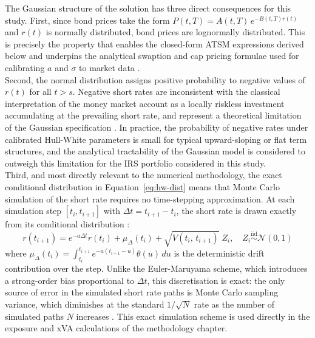     \noindent
    The Gaussian structure of the solution has three direct consequences for this study. First, since bond prices take the form $P(t,T) = A(t,T)\,e^{-B(t,T)r(t)}$ and $r(t)$ is normally distributed, bond prices are lognormally distributed. This is precisely the property that enables the closed-form ATSM expressions derived below and underpins the analytical swaption and cap pricing formulae used for calibrating $a$ and $\sigma$ to market data \cite{brigo2001interest}. \\

    \noindent
    Second, the normal distribution assigns positive probability to negative values of $r(t)$ for all $t > s$. Negative short rates are inconsistent with the classical interpretation of the money market account as a locally riskless investment accumulating at the prevailing short rate, and represent a theoretical limitation of the Gaussian specification \cite{Green_2016}. In practice, the probability of negative rates under calibrated Hull-White parameters is small for typical upward-sloping or flat term structures, and the analytical tractability of the Gaussian model is considered to outweigh this limitation for the IRS portfolio considered in this study. \\

    \noindent
    Third, and most directly relevant to the numerical methodology, the exact conditional distribution in Equation~\eqref{eq:hw-dist} means that Monte Carlo simulation of the short rate requires no time-stepping approximation. At each simulation step $[t_i, t_{i+1}]$ with $\Delta t = t_{i+1} - t_i$, the short rate is drawn exactly from its conditional distribution \cite{brigo2001interest}:
    \begin{equation}\label{eq:hw-mc}
        r(t_{i+1}) = e^{-a\Delta t}r(t_i) + \mu_{\Delta}(t_i)
                   + \sqrt{V(t_i,\,t_{i+1})}\;Z_i,
                   \quad Z_i \overset{\text{iid}}{\sim} \mathcal{N}(0,1)
    \end{equation}
    where $\mu_{\Delta}(t_i) = \int_{t_i}^{t_{i+1}} e^{-a(t_{i+1}-u)}\theta(u)\,du$ is the deterministic drift contribution over the step. Unlike the Euler-Maruyama scheme, which introduces a strong-order bias proportional to $\Delta t$, this discretisation is exact: the only source of error in the simulated short rate paths is Monte Carlo sampling variance, which diminishes at the standard $1/\sqrt{N}$ rate as the number of simulated paths $N$ increases \cite{kwok2008mathematical}. This exact simulation scheme is used directly in the exposure and xVA calculations of the methodology chapter. \\

